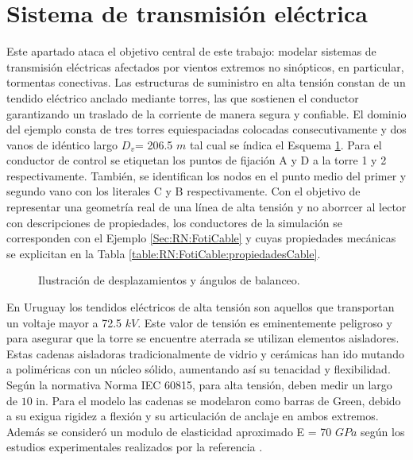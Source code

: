 \section{Sistema de transmisión eléctrica }\label{Sec:RN:TransmissionSystem}
Este apartado ataca el objetivo central de este trabajo: modelar sistemas de transmisión eléctricas afectados por vientos extremos no sinópticos, en particular, tormentas conectivas. Las estructuras de suministro en alta tensión constan de un tendido eléctrico anclado mediante torres, las que sostienen el conductor garantizando un traslado de la corriente de manera segura y confiable. El dominio del ejemplo consta de tres torres equiespaciadas colocadas consecutivamente y dos vanos de idéntico largo $D_v$= 206.5 $m$ tal cual se índica el Esquema \ref{fig:Transmission:EsquemaGeneral}.  Para el conductor de control se etiquetan los puntos de fijación $\text{A}$ y $\text{D}$ a la torre 1 y 2 respectivamente. También, se identifican los nodos en el punto medio del primer y segundo vano con los literales $\text{C}$ y $\text{B}$ respectivamente. Con el objetivo de representar una geometría real de una línea de alta tensión y no aborrcer al lector con descripciones de propiedades, los conductores de la simulación se corresponden con el Ejemplo \ref{Sec:RN:FotiCable} y cuyas propiedades mecánicas se explicitan en la Tabla \ref{table:RN:FotiCable:propiedadesCable}.  


\begin{figure}[htbp]
	\centering
	\def\svgwidth{120mm}
	
	\caption{Ilustración de desplazamientos y ángulos de balanceo.}
	\label{fig:Transmission:EsquemaGeneral}
\end{figure}

 En Uruguay los tendidos eléctricos de alta tensión son aquellos que transportan un voltaje mayor a 72.5 $kV$. Este valor de tensión es eminentemente peligroso y para asegurar que la torre se encuentre aterrada se utilizan elementos aisladores. Estas cadenas aisladoras tradicionalmente de vidrio y cerámicas han ido mutando a poliméricas con un núcleo sólido, aumentando así su tenacidad y flexibilidad. Según la normativa Norma IEC 60815, para alta tensión, deben medir un largo de $10$ in. Para el modelo las cadenas se modelaron como barras de Green, debido a su exigua rigidez a flexión y su articulación de anclaje en ambos extremos. Además se consideró un modulo de elasticidad aproximado E = 70 $GPa$ según los estudios experimentales realizados por la referencia \cite{TesisMexicano}.


